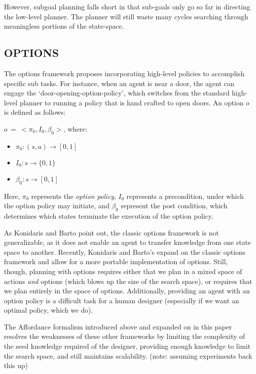 \documentclass[]{article}
\newcommand{\ignore}[1]{}
\begin{document}
However, subgoal planning falls short in that sub-goals only go so far in directing the low-level planner. The planner will still waste many cycles searching through meaningless portions of the state-space.



\subsection{OPTIONS}

The options framework proposes incorporating high-level policies to accomplish specific sub tasks. For instance, when an agent is near a door, the agent can engage the `door-opening-option-policy', which switches from the standard high-level planner to running a policy that is hand crafted to open doors. An option $o$ is defined as follows:

$o\ =\ <\pi_0, I_0, \beta_0>$, where:

\begin{itemize}
\item[] $\pi_0 : (s,a) \rightarrow [0,1]$
\item[] $I_0 : s \rightarrow \{0,1\}$
\item[] $\beta_0 : s \rightarrow [0,1]$
\end{itemize}

Here, $\pi_0$ represents the {\it option policy}, $I_0$ represents a precondition, under which the option policy may initiate, and $\beta_0$ represent the post condition, which determines which states terminate the execution of the option policy.

As Konidaris and Barto point out, the classic options framework is not generalizable, as it does not enable an agent to transfer knowledge from one state space to another. Recently, Konidaris and Barto's \ignore{cite} expand on the classic options framework and allow for a more portable implementation of options. Still, though, planning with options requires either that we plan in a mixed space of actions {\it and} options (which blows up the size of the search space), or requires that we plan entirely in the space of options. Additionally, providing an agent with an option policy is a difficult task for a human designer (especially if we want an optimal policy, which we do).

The Affordance formalism introduced above and expanded on in this paper resolves the weaknesses of these other frameworks by limiting the complexity of the seed knowledge required of the designer, providing enough knowledge to limit the search space, and still maintains scalability. (note: assuming experiments back this up)
\end{document}
